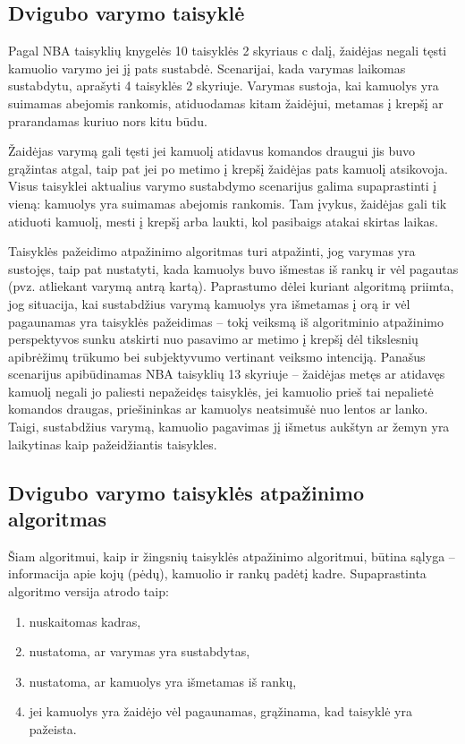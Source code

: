 \documentclass{VUMIFPSbakalaurinis}
\begin{document}
\subsection{Dvigubo varymo taisyklė}
Pagal NBA taisyklių knygelės 10 taisyklės 2 skyriaus c dalį, žaidėjas negali tęsti kamuolio varymo jei jį pats sustabdė. Scenarijai, kada varymas laikomas sustabdytu, aprašyti 4 taisyklės 2 skyriuje. Varymas sustoja, kai kamuolys yra suimamas abejomis rankomis, atiduodamas kitam žaidėjui, metamas į krepšį ar prarandamas kuriuo nors kitu būdu. 

Žaidėjas varymą gali tęsti jei kamuolį atidavus komandos draugui jis buvo grąžintas atgal, taip pat jei po metimo į krepšį žaidėjas pats kamuolį atsikovoja. Visus taisyklei aktualius varymo sustabdymo scenarijus galima supaprastinti į vieną: kamuolys yra suimamas abejomis rankomis. Tam įvykus, žaidėjas gali tik atiduoti kamuolį, mesti į krepšį arba laukti, kol pasibaigs atakai skirtas laikas. 

Taisyklės pažeidimo atpažinimo algoritmas turi atpažinti, jog varymas yra sustojęs, taip pat nustatyti, kada kamuolys buvo išmestas iš rankų ir vėl pagautas (pvz. atliekant varymą antrą kartą). Paprastumo dėlei kuriant algoritmą priimta, jog situacija, kai sustabdžius varymą kamuolys yra išmetamas į orą ir vėl pagaunamas yra taisyklės pažeidimas – tokį veiksmą iš algoritminio atpažinimo perspektyvos sunku atskirti nuo pasavimo ar metimo į krepšį dėl tikslesnių apibrėžimų trūkumo bei subjektyvumo vertinant veiksmo intenciją. Panašus scenarijus apibūdinamas NBA taisyklių 13 skyriuje – žaidėjas metęs ar atidavęs kamuolį negali jo paliesti nepažeidęs taisyklės, jei kamuolio prieš tai nepalietė komandos draugas, priešininkas ar kamuolys neatsimušė nuo lentos ar lanko. Taigi, sustabdžius varymą, kamuolio pagavimas jį išmetus aukštyn ar žemyn yra laikytinas kaip pažeidžiantis taisykles. 

\subsection{Dvigubo varymo taisyklės atpažinimo algoritmas}

Šiam algoritmui, kaip ir žingsnių taisyklės atpažinimo algoritmui, būtina sąlyga – informacija apie kojų (pėdų), kamuolio ir rankų padėtį kadre. Supaprastinta algoritmo versija atrodo taip: 

\begin{enumerate}
 	\item nuskaitomas kadras,
 	\item nustatoma, ar varymas yra sustabdytas,
 	\item nustatoma, ar kamuolys yra išmetamas iš rankų,
 	\item jei kamuolys yra žaidėjo vėl pagaunamas, grąžinama, kad taisyklė yra pažeista.
\end{enumerate}
\end{document}
